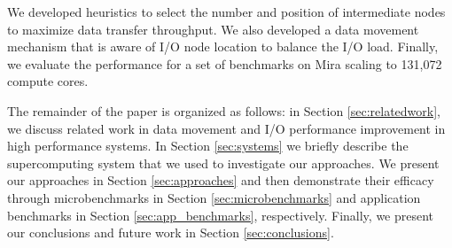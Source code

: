 We developed heuristics to select the number and position of intermediate nodes to maximize data transfer throughput. We also developed a data movement mechanism that is aware of I/O node location to balance the I/O load. Finally, we evaluate the performance for a set of benchmarks on Mira scaling to 131,072 compute cores.

The remainder of the paper is organized as follows: in Section \ref{sec:relatedwork}, we discuss related work in data movement and I/O performance improvement in high performance systems. In Section \ref{sec:systems} we briefly describe the supercomputing system that we used to investigate our approaches. We present our approaches in Section \ref{sec:approaches} and then demonstrate their efficacy through microbenchmarks in Section \ref{sec:microbenchmarks} and application benchmarks in Section \ref{sec:app_benchmarks}, respectively. Finally, we present our conclusions and future work in Section \ref{sec:conclusions}.